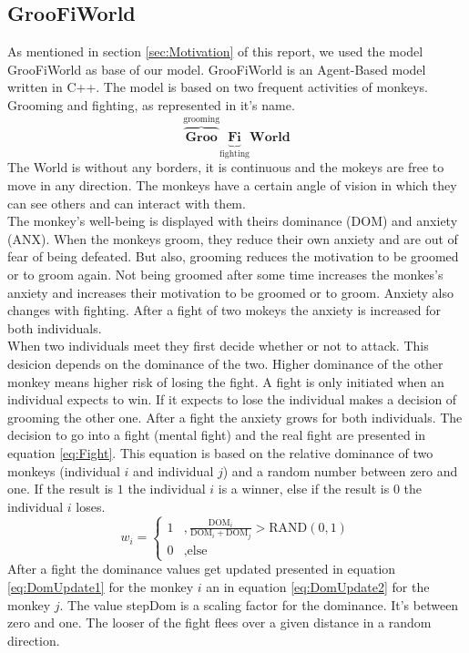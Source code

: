 \documentclass[11pt]{article}
\begin{document}
\subsection{GrooFiWorld}
As mentioned in section \ref{sec:Motivation} of this report, we used the model GrooFiWorld as base of our model. GrooFiWorld is an Agent-Based model written in C++.\cite{Puga-Gonzalez2009} The model is based on two frequent activities of monkeys. Grooming and fighting, as represented in it's name.\\
\[ \overbrace{\textbf{Groo}}^\text{grooming}\underbrace{\textbf{Fi}}_\text{fighting}\textbf{World} \]
The World is without any borders, it is continuous and the mokeys are free to move in any direction. The monkeys have a certain angle of vision in which they can see others and can interact with them.\\
The monkey's well-being  is displayed with theirs  dominance (DOM) and anxiety (ANX). When the monkeys groom, they reduce their own anxiety and are out of fear of being defeated. But also, grooming reduces the motivation to be groomed or to groom again. Not being groomed after some time increases the monkes's anxiety and increases their motivation to be groomed or to groom. Anxiety also changes with fighting. After a fight of two mokeys the anxiety is increased for both individuals.\\
When two individuals meet they first decide whether or not to attack. This desicion depends on the dominance of the two. Higher dominance of the other monkey means higher risk of losing the fight. A fight is only initiated when an individual expects to win. If it expects to lose the individual makes a decision of grooming the other one. After a fight the anxiety grows for both individuals. The decision to go into a fight (mental fight) and the real fight are presented in equation \ref{eq:Fight}. This equation is based on the relative dominance of two monkeys (individual $i$ and individual $j$) and a random number between zero and one. If the result is $1$ the individual $i$ is a winner, else if the result is $0$ the individual $i$ loses.
\begin{equation}
\label{eq:Fight}
w_i=\left\lbrace\begin{array}{cc}
1 & ,\frac{\text{DOM}_i}{\text{DOM}_i+\text{DOM}_j}>\text{RAND}(0,1)\\
0 & ,\text{else}
\end{array}\right.
\end{equation}
After a fight the dominance values get updated presented in equation \ref{eq:DomUpdate1} for the monkey $i$ an in equation \ref{eq:DomUpdate2} for the monkey $j$. The value stepDom is a scaling factor for the dominance. It's between zero and one. The looser of the fight flees over a given distance in a random direction.
\end{document}
